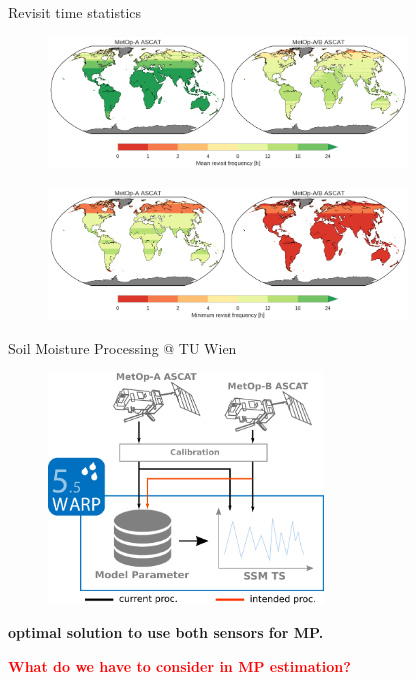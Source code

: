 \documentclass[10pt,ignorenonframetext,xcolor={dvipsnames, table}]{beamer}
\begin{document}
\begin{frame}{Revisit time statistics}

\begin{figure}
\includegraphics[width=0.85\textwidth]{./figures/revisit_freq_map_mean.png}
\end{figure}

\begin{figure}
\includegraphics[width=0.85\textwidth]{./figures/revisit_freq_map_min.png}
\end{figure}

\end{frame}

\begin{frame}{Soil Moisture Processing @ TU Wien}

\begin{figure}
\includegraphics[width=0.65\textwidth]{./figures/warp_processing.png}
\end{figure}

\begin{center}
\textbf{optimal solution to use both sensors for MP.}

\newline

\textcolor{red}{\textbf{What do we have to consider in MP estimation?}}
\end{center}

\end{frame}
\end{document}
